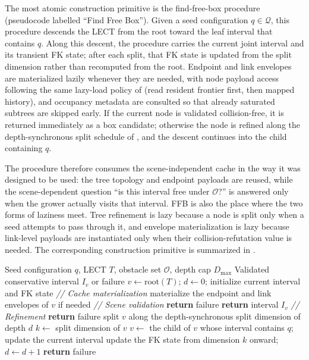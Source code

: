 \documentclass[journal]{IEEEtran}
\DeclareRobustCommand{\textsc}[1]{\textnormal{\MakeUppercase{#1}}}
\newcommand{\calO}{\ensuremath{\mathcal{O}}}
\newcommand{\Q}{\ensuremath{\mathcal{Q}}}
\begin{document}
The most atomic construction primitive is the find-free-box procedure (pseudocode
labelled ``Find Free Box''). Given a seed configuration $q\in\Q$, this
procedure descends the LECT from the root toward the leaf interval that
contains $q$. Along this descent, the procedure carries the current joint
interval and its transient FK state; after each split, that FK state is updated
from the split dimension rather than recomputed from the root. Endpoint and
link envelopes are materialized lazily whenever they are needed, with node
payload access following the same lazy-load policy of 
(read resident frontier first, then mapped history), and occupancy
metadata are consulted so that already saturated subtrees are skipped early. If
the current node is validated collision-free, it is returned immediately as a
box candidate; otherwise the node is refined along the depth-synchronous split
schedule of , and the descent continues into the child
containing $q$.

The procedure therefore consumes the scene-independent cache in the way
it was designed to be used: the tree topology and endpoint payloads are reused,
while the scene-dependent question ``is this interval free under $\calO$?'' is
answered only when the grower actually visits that interval. FFB is also the
place where the two forms of laziness meet. Tree refinement is lazy because a
node is split only when a seed attempts to pass through it, and envelope
materialization is lazy because link-level payloads are instantiated only when
their collision-refutation value is needed. The corresponding construction
primitive is summarized in .

\begin{algorithm}[t]
\caption{\textsc{FindFreeBox}---lazy LECT descent with conservative scene validation}
\label{alg:ffb_rewrite}
\footnotesize
\begin{algorithmic}[1]
\REQUIRE Seed configuration $q$, LECT $T$, obstacle set $\calO$, depth cap $D_{\max}$
\ENSURE Validated conservative interval $I_v$ or failure
\STATE $v \gets \mathrm{root}(T)$; $d \gets 0$; initialize current interval and FK state
  \STATE \textit{// Cache materialization}
  \STATE materialize the endpoint and link envelopes of $v$ if needed
  \STATE \textit{// Scene validation}
    \STATE \textbf{return} failure
  \ENDIF
  \IF{$v$ is validated collision-free with respect to $\calO$}
    \STATE \textbf{return} interval $I_v$
  \ENDIF
  \STATE \textit{// Refinement}
    \STATE \textbf{return} failure
  \ENDIF
    \STATE split $v$ along the depth-synchronous split dimension of depth $d$
  \ENDIF
  \STATE $k \gets$ split dimension of $v$
  \STATE $v \gets$ the child of $v$ whose interval contains $q$; update the current interval
  \STATE update the FK state from dimension $k$ onward; $d \gets d+1$
\ENDWHILE
\STATE \textbf{return} failure
\end{algorithmic}
\end{algorithm}
\end{document}
